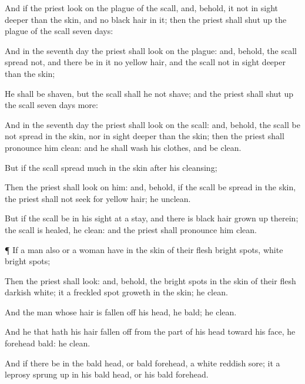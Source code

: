 {And if the
priest
look on the
plague of the
scall, and, behold, it
{} not in
sight
deeper than the
skin, and
{} no
black
hair in it; then the
priest shall
shut up
{} the
plague of the
scall
seven
days:

And in the
seventh
day the
priest shall
look on the
plague: and, behold,
{} the
scall
spread not, and there be in it no
yellow
hair, and the
scall
{} not in
sight
deeper than the
skin;

He shall be
shaven, but the
scall shall he not
shave; and the
priest shall
shut up
{} the
scall
seven
days
more:

And in the
seventh
day the
priest shall
look on the
scall: and, behold,
{} the
scall be not
spread in the
skin, nor
{} in
sight
deeper than the
skin; then the
priest shall pronounce him
clean: and he shall
wash his
clothes, and be
clean.

But if the
scall
spread
much in the
skin
after his
cleansing;

Then the
priest shall
look on him: and, behold, if the
scall be
spread in the
skin, the
priest shall not
seek for
yellow
hair; he
{}
unclean.

But if the
scall be in his
sight at a
stay, and
{} there is
black
hair
grown up therein; the
scall is
healed, he
{}
clean: and the
priest shall pronounce him
clean.


\par }{\PP {}¶ If a
man also or a
woman have in the
skin of their
flesh bright
spots,
{}
white bright
spots;

Then the
priest shall
look: and, behold,
{} the bright
spots in the
skin of their
flesh
{}
darkish
white; it
{} a freckled
spot
{}
groweth in the
skin; he
{}
clean.

And the
man whose hair is
fallen off his
head, he
{}
bald;
{} he
clean.

And he that hath his hair
fallen off from the
part of his
head toward his
face, he
{} forehead
bald:
{} he
clean.

And if there be in the bald
head, or bald
forehead, a
white
reddish
sore; it
{} a
leprosy
sprung up in his bald
head, or his bald
forehead.

}
